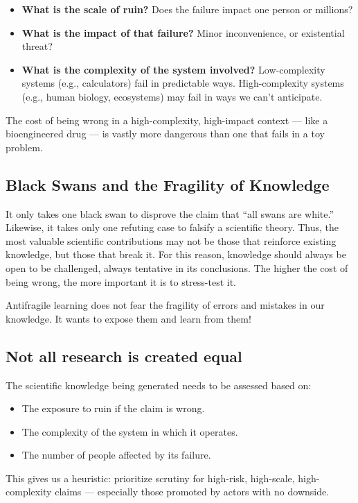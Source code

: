 \begin{itemize}
	\item \textbf{What is the scale of ruin?} Does the failure impact one person or millions?
	\item \textbf{What is the impact of that failure?} Minor inconvenience, or existential threat?
	\item \textbf{What is the complexity of the system involved?} Low-complexity systems (e.g., calculators) fail in predictable ways. High-complexity systems (e.g., human biology, ecosystems) may fail in ways we can’t anticipate.
\end{itemize}

The cost of being wrong in a high-complexity, high-impact context — like a bioengineered drug — is vastly more dangerous than one that fails in a toy problem. 

\subsection{Black Swans and the Fragility of Knowledge}

It only takes one black swan to disprove the claim that “all swans are white.” Likewise, it takes only one refuting case to falsify a scientific theory. Thus, the most valuable scientific contributions may not be those that reinforce existing knowledge, but those that break it. For this reason, knowledge should always be open to be challenged, always tentative in its conclusions. The higher the cost of being wrong, the more important it is to stress-test it.

Antifragile learning does not fear the fragility of errors and mistakes in our knowledge. It wants to expose them and learn from them!

\subsection{Not all research is created equal}

The scientific knowledge being generated needs to be assessed based on:
\begin{itemize}
	\item The exposure to ruin if the claim is wrong.
	\item The complexity of the system in which it operates.
	\item The number of people affected by its failure.
\end{itemize}

This gives us a heuristic: prioritize scrutiny for high-risk, high-scale, high-complexity claims — especially those promoted by actors with no downside.

